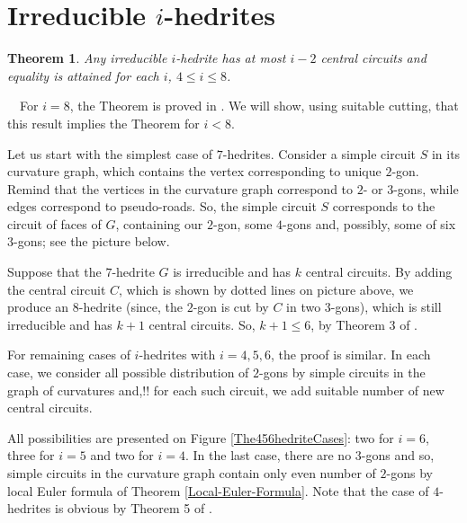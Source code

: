 \documentclass[12pt]{article}
\newtheorem{theorem}{Theorem}
\newcommand{\proof}{\noindent{\bf Proof.}\ \ }
\begin{document}
\section{Irreducible $i$-hedrites}



\begin{theorem}\label{irre}
Any irreducible $i$-hedrite has at most $i-2$ central circuits and equality is attained for each $i$, $4\leq i\leq 8$.
\end{theorem}
\proof For $i=8$, the Theorem is proved in \cite{DSt}. We will show, using suitable cutting, that this result implies the Theorem for $i<8$.

Let us start with the simplest case of $7$-hedrites. Consider a simple circuit $S$ in its curvature graph, which contains the vertex corresponding to unique $2$-gon. Remind that the vertices in the curvature graph correspond to $2$- or $3$-gons, while edges correspond to pseudo-roads. So, the simple circuit $S$ corresponds to the circuit of faces of $G$, containing our $2$-gon, some $4$-gons and, possibly, some of six $3$-gons; see the picture below.


\begin{center}
\epsfxsize=40mm
\end{center}






Suppose that the $7$-hedrite $G$ is irreducible and has $k$ central circuits. By adding the central circuit $C$, which is shown by dotted lines on picture above, we produce an $8$-hedrite (since, the $2$-gon is cut by $C$ in two $3$-gons), which is still irreducible and has $k+1$ central circuits. So, $k+1\leq 6$, by Theorem 3 of \cite{DSt}.


For remaining cases of $i$-hedrites with $i=4,5,6$, the proof is similar. In each case, we consider all possible distribution of $2$-gons by simple circuits in the graph of curvatures and,!! for each such circuit, we add suitable number of new central circuits.


All possibilities are presented on Figure \ref{The456hedriteCases}:
two for $i=6$, three for $i=5$ and two for $i=4$. In the last case, there
are no $3$-gons and so, simple circuits in the curvature graph contain
only even number of $2$-gons by local Euler formula of Theorem 
\ref{Local-Euler-Formula}. Note that the case of $4$-hedrites is
obvious by Theorem 5 of \cite{DSt}.


\end{document}
